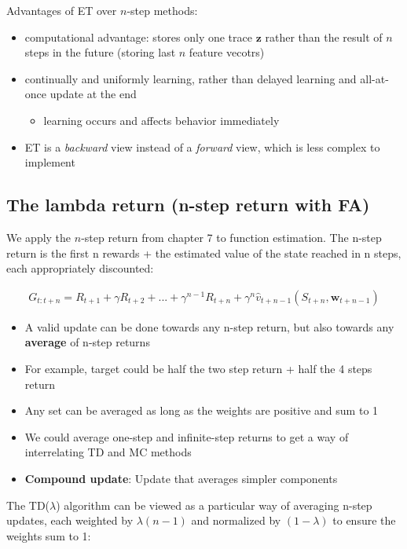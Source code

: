 \documentclass[sutton_barto_notes.tex]{subfiles}
\begin{document}
Advantages of ET over $n$-step methods: 
\begin{itemize}
\item computational advantage: stores only one trace $\mathbf{z}$ rather than the result of $n$ steps in the future (storing last $n$ feature vecotrs)
\item continually and uniformly learning, rather than delayed learning and all-at-once update at the end
\begin{itemize}
	\item learning occurs and affects behavior immediately
\end{itemize}
\item ET is a \textit{backward} view instead of a \textit{forward} view, which is less complex to implement 
\end{itemize}

\subsection{The lambda return (n-step return with FA)}

 We apply the $n$-step return from chapter 7 to function estimation. The n-step return is the first n rewards + the estimated value of the state reached in n steps, each appropriately discounted: 

\begin{align}
G_{t:t+n} = R_{t+1} + \gamma R_{t+2} + ... + \gamma^{n-1} R_{t+n} + \gamma^n \hat{v}_{t+n-1}(S_{t+n}, \mathbf{w}_{t+n-1}) \label{eq:12.1}\tag{12.1}
\end{align}

\begin{itemize}
\item A valid update can be done towards any n-step return, but also towards any \textbf{average} of n-step returns 
\item For example, target could be half the two step return + half the 4 steps return 
\item Any set can be averaged as long as the weights are positive and sum to 1 
\item We could average one-step and infinite-step returns to get a way of interrelating TD and MC methods 
\item \textbf{Compound update}: Update that averages simpler components 
\end{itemize}

 The TD($\lambda$) algorithm can be viewed as a particular way of averaging n-step updates, each weighted by $\lambda{(n-1)}$ and normalized by $(1 - \lambda)$ to ensure the weights sum to 1: 
\end{document}
